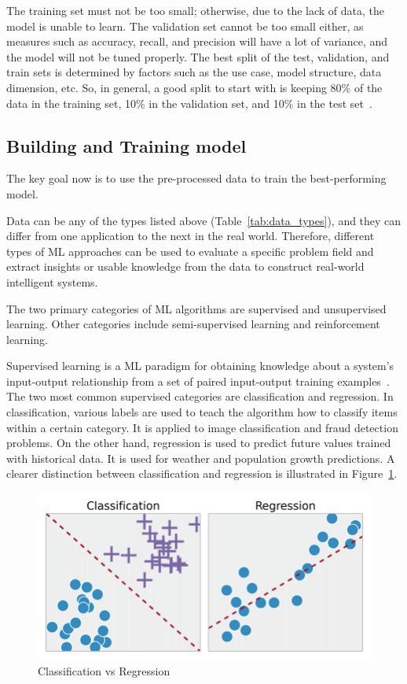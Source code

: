 The training set must not be too small; otherwise, due to the lack of data, the model is unable to learn. The validation set cannot be too small either, as measures such as accuracy, recall, and precision will have a lot of variance, and the model will not be tuned properly. The best split of the test, validation, and train sets is determined by factors such as the use case, model structure, data dimension, etc. So, in general, a good split to start with is keeping 80\% of the data in the training set, 10\% in the validation set, and 10\% in the test set~\cite{Baheti2021TrainData}.

\subsection{Building and Training model}

The key goal now is to use the pre-processed data to train the best-performing model.

Data can be any of the types listed above (Table~\ref{tab:data_types}), and they can differ from one application to the next in the real world. Therefore, different types of \gls{ML} approaches can be used to evaluate a specific problem field and extract insights or usable knowledge from the data to construct real-world intelligent systems.

The two primary categories of \gls{ML} algorithms are supervised and unsupervised learning. Other categories include semi-supervised learning and reinforcement learning. 

Supervised learning is a \gls{ML} paradigm for obtaining knowledge about a system's input-output relationship from a set of paired input-output training examples~\cite{Liu2012SupervisedLearning}. The two most common supervised categories are classification and regression. In classification, various labels are used to teach the algorithm how to classify items within a certain category. It is applied to image classification and fraud detection problems. On the other hand, regression is used to predict future values trained with historical data. It is used for weather and population growth predictions. A clearer distinction between classification and regression is illustrated in Figure~\ref{fig:regression_vs_classification}.
    
\begin{figure}[htbp]
    \centering
    \includegraphics[width=0.7\linewidth]{Chapters/Figures/regression-vs-classification.png}
    \caption{Classification vs Regression~\cite{Matanga2017AnalysisInterfaces}}
    \label{fig:regression_vs_classification}
\end{figure}

